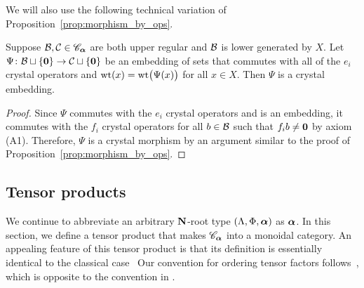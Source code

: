 \documentclass[11pt]{article}
\begin{document}
We will also use the following technical variation of Proposition~\ref{prop:morphism_by_ops}.

\begin{lemma}
\label{lemma:lower_embed_check}
Suppose $\mathcal{B}, \mathcal{C} \in \mathscr{C}_{\boldsymbol{\alpha}}$ are both upper regular and $\mathcal{B}$ is lower generated by $X$.
Let $\Psi \colon \mathcal{B} \sqcup \{\boldsymbol{0}\} \to \mathcal{C} \sqcup \{\boldsymbol{0}\}$ be an embedding of sets that commutes with all of the $e_i$ crystal operators and $\operatorname{wt}(x) = \operatorname{wt}\bigl(\Psi(x)\bigr)$ for all $x \in X$.
Then $\Psi$ is a crystal embedding.
\end{lemma}

\begin{proof}
Since $\Psi$ commutes with the $e_i$ crystal operators and is an embedding, it commutes with the $f_i$ crystal operators for all $ b \in \mathcal{B}$ such that $f_i b \neq \boldsymbol{0}$ by axiom (A1).
Therefore, $\Psi$ is a crystal morphism by an argument similar to the proof of Proposition~\ref{prop:morphism_by_ops}.
\end{proof}




\subsection{Tensor products}

We continue to abbreviate an arbitrary $\mathbf{N}$-root type $(\Lambda, \Phi, \boldsymbol{\alpha})$ as $\boldsymbol{\alpha}$.
In this section, we define a tensor product that makes $\mathscr{C}_{\boldsymbol{\alpha}}$ into a monoidal category.
An appealing feature of this tensor product is that its definition is essentially identical to the classical case~\cite[\S1.3]{Kashiwara93}
Our convention for ordering tensor factors follows~\cite[\S2.3]{BumpSchilling}, which is opposite to the convention in \cite{Kashiwara93}.
\end{document}
